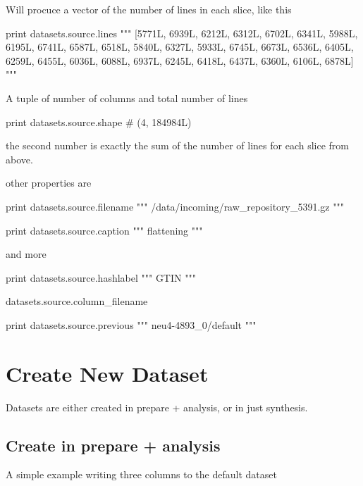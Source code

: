 Will procuce a vector of the number of lines in each slice, like this

\begin{python}
  print datasets.source.lines
  """
[5771L, 6939L, 6212L, 6312L, 6702L, 6341L, 5988L, 6195L,
 6741L, 6587L, 6518L, 5840L, 6327L, 5933L, 6745L, 6673L,
 6536L, 6405L, 6259L, 6455L, 6036L, 6088L, 6937L, 6245L,
 6418L, 6437L, 6360L, 6106L, 6878L]
"""
\end{python}

A tuple of number of columns and total number of lines

\begin{python}
  print datasets.source.shape
  # (4, 184984L)
\end{python}
the second number is exactly the sum of the number of lines for each
slice from above.

other properties are

\begin{python}
  print datasets.source.filename
  """
/data/incoming/raw_repository_5391.gz
"""
\end{python}

\begin{python}
  print datasets.source.caption
  """
flattening
"""
\end{python}


and more

\begin{python}
  print datasets.source.hashlabel
  """
GTIN
"""
\end{python}
\begin{python}
datasets.source.column\_filename
\end{python}

\begin{python}
  print datasets.source.previous
  """
neu4-4893_0/default
"""
\end{python}






\section{Create New Dataset}
Datasets are either created in prepare + analysis, or in just
synthesis.

\subsection{Create in prepare + analysis}
A simple example writing three columns to the default dataset

